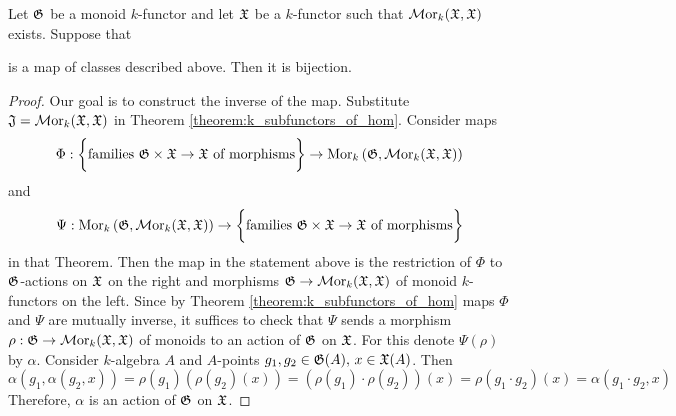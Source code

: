 \begin{theorem}\label{theorem:actions_and_monoid_morphisms}
Let ${\mathfrak G}$ be a monoid $k$-functor and let ${\mathfrak X}$ be a $k$-functor such that $\mathcal{M}\mathrm{or}_{k}({\mathfrak X},{\mathfrak X})$ exists. Suppose that
\begin{center}
\end{center}
is a map of classes described above. Then it is bijection.
\end{theorem}
\begin{proof}
Our goal is to construct the inverse of the map. Substitute ${\mathfrak J} = \mathcal{M}\mathrm{or}_k({\mathfrak X},{\mathfrak X})$ in Theorem \ref{theorem:k_subfunctors_of_hom}. Consider maps
$$\Phi:\bigg\{\mbox{families }{\mathfrak G}\times {\mathfrak X}\rightarrow {\mathfrak X}\mbox{ of morphisms}\bigg\} \rightarrow  \mathrm{Mor}_{k}\left({\mathfrak G},\mathcal{M}\mathrm{or}_k({\mathfrak X},{\mathfrak X})\right)$$
and
$$\Psi:\mathrm{Mor}_{k}\left({\mathfrak G}, \mathcal{M}\mathrm{or}_k({\mathfrak X},{\mathfrak X})\right) \rightarrow \bigg\{\mbox{families }{\mathfrak G}\times {\mathfrak X}\rightarrow {\mathfrak X}\mbox{ of morphisms}\bigg\}$$
in that Theorem. Then the map in the statement above is the restriction of $\Phi$ to ${\mathfrak G}$-actions on ${\mathfrak X}$ on the right and morphisms ${\mathfrak G}\rightarrow \mathcal{M}\mathrm{or}_k({\mathfrak X},{\mathfrak X})$ of monoid $k$-functors on the left. Since by Theorem \ref{theorem:k_subfunctors_of_hom} maps $\Phi$ and $\Psi$ are mutually inverse, it suffices to check that $\Psi$ sends a morphism $\rho:{\mathfrak G}\rightarrow \mathcal{M}\mathrm{or}_{k}({\mathfrak X},{\mathfrak X})$ of monoids to an action of ${\mathfrak G}$ on ${\mathfrak X}$. For this denote $\Psi(\rho)$ by $\alpha$. Consider $k$-algebra $A$ and $A$-points $g_1,g_2\in {\mathfrak G}(A),\,x\in {\mathfrak X}(A)$. Then
$$\alpha\left(g_1, \alpha(g_2, x)\right) = \rho(g_1)\left(\rho(g_2)(x)\right) = \left(\rho(g_1)\cdot \rho(g_2)\right)(x) = \rho\left(g_1\cdot g_2\right)(x) = \alpha\left(g_1\cdot g_2, x\right)$$
Therefore, $\alpha$ is an action of ${\mathfrak G}$ on ${\mathfrak X}$.
\end{proof}

